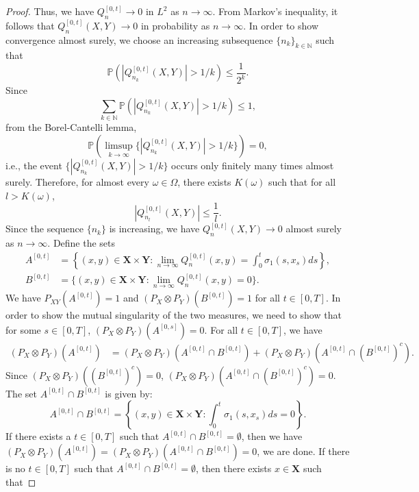 \documentclass[12pt]{amsart}
\theoremstyle{definition}
\theoremstyle{remark}
\begin{document}
\begin{proof}
    Thus, we have $Q_n^{[0,t]}\to 0$ in $L^2$ as $n\to\infty$. From Markov's inequality, it follows that $Q_n^{[0,t]}(X,Y)\to0$ in probability as $n\to\infty$. In order to show convergence almost surely, we choose an increasing subsequence $\{n_k\}_{k\in \mathbb{N}}$ such that
    \begin{equation*}
        \mathbb{P}(|Q^{[0,t]}_{n_k}(X,Y)|>1/k) \leq \frac{1}{2^k}.
    \end{equation*}
    Since
    \[
        \sum_{k\in\mathbb{N}}\mathbb{P}(|Q^{[0,t]}_{n_k}(X,Y)|>1/k)  \leq 1,
    \]
    from the Borel-Cantelli lemma,
    \begin{equation*}
        \mathbb{P}(\limsup_{k\to\infty}\{|Q^{[0,t]}_{n_k}(X,Y)|>1/k\}) = 0,
    \end{equation*}
    i.e., the event $\{|Q^{[0,t]}_{n_k}(X,Y)|>1/k\}$ occurs only finitely many times almost surely.
    Therefore, for almost every $\omega\in\Omega$, there exists $K(\omega)$ such that for all $l>K(\omega)$,
    \[
        |Q^{[0,t]}_{n_l}(X,Y)|\leq\frac{1}{l}.
    \]
    Since the sequence $\{n_k\}$ is increasing, we have $Q_n^{[0,t]}(X,Y) \to 0$ almost surely as $n\to\infty$.
    Define the sets
    \begin{align*}
        A^{[0,t]} &= \left\{(x,y)\in\mathbf{X\times Y}:\lim_{n\to\infty}Q_n^{[0,t]}(x,y) = \int_0^t\sigma_1(s,x_s)ds\right\},\\
        B^{[0,t]} &= \{(x,y)\in\mathbf{X\times Y}:\lim_{n\to\infty}Q_n^{[0,t]}(x,y) =0\}.
    \end{align*}
    We have $P_{XY}(A^{[0,t]}) = 1$ and $(P_X\otimes P_Y)(B^{[0,t]}) =1$ for all $t\in [0,T]$. In order to show the mutual singularity of the two measures, we need to show that for some $s\in[0,T]$, $(P_X\otimes P_Y)(A^{[0,s]}) = 0$. For all $t\in[0,T]$, we have
    \begin{align*}
        (P_X\otimes P_Y)(A^{[0,t]}) &= (P_X\otimes P_Y)(A^{[0,t]}\cap B^{[0,t]}) + (P_X\otimes P_Y)(A^{[0,t]}\cap (B^{[0,t]})^c).
    \end{align*}
    Since $(P_X\otimes P_Y)((B^{[0,t]})^c) = 0$, $(P_X\otimes P_Y)(A^{[0,t]}\cap (B^{[0,t]})^c) = 0$. The set $A^{[0,t]}\cap B^{[0,t]}$ is given by:
    \begin{equation*}
        A^{[0,t]}\cap B^{[0,t]} = \left\{(x,y)\in\mathbf{X\times Y}:\int_0^t\sigma_1(s,x_s)ds = 0\right\}.
    \end{equation*}
    If there exists a $t\in[0,T]$ such that $A^{[0,t]}\cap B^{[0,t]} = \emptyset$, then we have $(P_X\otimes P_Y)(A^{[0,t]}) = (P_X\otimes P_Y)(A^{[0,t]}\cap B^{[0,t]}) = 0$, we are done. If there is no $t\in[0,T]$ such that $A^{[0,t]}\cap B^{[0,t]} = \emptyset$, then there exists $x\in\mathbf{X}$ such that

\end{proof}
\end{document}
